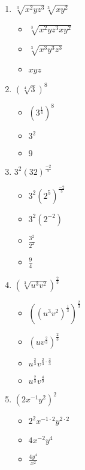 \documentclass{article}
\begin{document}
\begin{onehalfspace}
\begin{enumerate}[start=69]
        \item $\sqrt[3]{x^{2}yz^{3}} \sqrt[3]{xy^{2}}$
        \begin{itemize}
            \item $\sqrt[3]{x^{2}yz^{3}xy^{2}}$
            \item $\sqrt[3]{x^{3}y^{3}z^{3}}$
            \item $xyz$
        \end{itemize}

        \item $(\sqrt[4]{3})^{8}$
        \begin{itemize}
            \item $(3^{\frac{1}{4}})^{8}$
            \item $3^{2}$
            \item $9$
        \end{itemize}

        \item $3^{2}(32)^{\frac{-2}{5}}$
        \begin{itemize}
            \item $3^{2}(2^{5})^{\frac{-2}{5}}$
            \item $3^{2}(2^{-2})$
            \item $\frac{3^{2}}{2^{2}}$
            \item $\frac{9}{4}$
        \end{itemize}

        \item $(\sqrt[3]{u^{3}v^{2}})^{\frac{2}{3}}$
        \begin{itemize}
            \item $\left( (u^{3}v^{2})^{\frac{1}{3}} \right)^{\frac{2}{3}}$
            \item $\left( uv^{\frac{2}{3}} \right)^{\frac{2}{3}}$
            \item $u^{\frac{2}{3}}v^{\frac{2}{3} \cdot \frac{2}{3}}$
            \item $u^{\frac{2}{3}}v^{\frac{4}{9}}$
        \end{itemize}

        \item $(2x^{-1}y^{2})^{2}$
        \begin{itemize}
            \item $2^{2} x^{-1 \cdot 2} y^{2 \cdot 2}$
            \item $4 x^{-2} y^{4}$
            \item $\frac{4y^{4}}{x^{2}}$
        \end{itemize}


\end{enumerate}
\end{onehalfspace}
\end{document}
